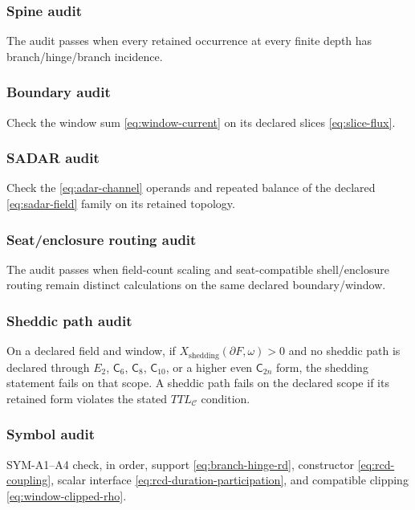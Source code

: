 \subsubsection{Spine audit}\label{subsec:spine-audit}
The audit passes when every retained occurrence at every finite depth has branch/hinge/branch incidence.

\subsubsection{Boundary audit}\label{subsec:boundary-audit}
Check the window sum \eqref{eq:window-current} on its declared slices
\eqref{eq:slice-flux}.

\subsubsection{SADAR audit}\label{subsec:sadar-audit}
Check the \eqref{eq:adar-channel} operands and repeated balance of the declared
\eqref{eq:sadar-field} family on its retained topology.

\subsubsection{Seat/enclosure routing audit}\label{subsec:support-enclosure-audit}
The audit passes when field-count scaling and seat-compatible shell/enclosure routing remain distinct calculations on the same declared boundary/window.

\subsubsection{Sheddic path audit}\label{subsec:sheddic-path-audit}
On a declared field and window, if \(X_{\mathrm{shedding}}(\partial F,\omega)>0\) and no sheddic path is declared through \(E_2\), \(\mathsf C_6\), \(\mathsf C_8\), \(\mathsf C_{10}\), or a higher even \(\mathsf C_{2n}\) form, the shedding statement fails on that scope. A sheddic path fails on the declared scope if its retained form violates the stated \(TTL_{\mathcal C}\) condition.



\subsubsection{Symbol audit}\label{subsec:symbol-audit}
SYM-A1--A4 check, in order, support \eqref{eq:branch-hinge-rd}, constructor
\eqref{eq:rcd-coupling}, scalar interface \eqref{eq:rcd-duration-participation},
and compatible clipping \eqref{eq:window-clipped-rho}.

